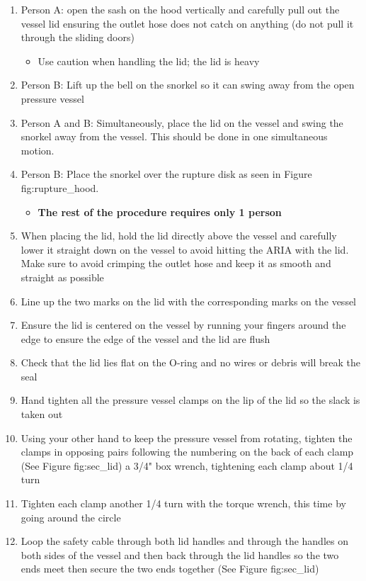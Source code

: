 \begin{enumerate}
  \begin{enumerate}
  \def\labelenumii{\arabic{enumii}.}
  \tightlist
  \item
    Person A: open the sash on the hood vertically and carefully pull
    out the vessel lid ensuring the outlet hose does not catch on
    anything (do not pull it through the sliding doors)

    \begin{itemize}
    \tightlist
    \item
      Use caution when handling the lid; the lid is heavy
    \end{itemize}
  \item
    Person B: Lift up the bell on the snorkel so it can swing away from
    the open pressure vessel
  \item
    Person A and B: Simultaneously, place the lid on the vessel and
    swing the snorkel away from the vessel. This should be done in one
    simultaneous motion.
  \item
    Person B: Place the snorkel over the rupture disk as seen in Figure
    fig:rupture\_hood.

    \begin{itemize}
    \tightlist
    \item
      \textbf{The rest of the procedure requires only 1 person}
    \end{itemize}
  \item
    When placing the lid, hold the lid directly above the vessel and
    carefully lower it straight down on the vessel to avoid hitting the
    ARIA with the lid. Make sure to avoid crimping the outlet hose and
    keep it as smooth and straight as possible
  \item
    Line up the two marks on the lid with the corresponding marks on the
    vessel
  \item
    Ensure the lid is centered on the vessel by running your fingers
    around the edge to ensure the edge of the vessel and the lid are
    flush
  \item
    Check that the lid lies flat on the O-ring and no wires or debris
    will break the seal
  \item
    Hand tighten all the pressure vessel clamps on the lip of the lid so
    the slack is taken out
  \item
    Using your other hand to keep the pressure vessel from rotating,
    tighten the clamps in opposing pairs following the numbering on the
    back of each clamp (See Figure fig:sec\_lid) a 3/4" box wrench,
    tightening each clamp about 1/4 turn
  \item
    Tighten each clamp another 1/4 turn with the torque wrench, this
    time by going around the circle
  \item
    Loop the safety cable through both lid handles and through the
    handles on both sides of the vessel and then back through the lid
    handles so the two ends meet then secure the two ends together (See
    Figure fig:sec\_lid)
  \end{enumerate}


\end{enumerate}
